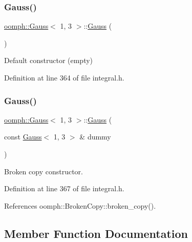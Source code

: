 \subsubsection{\texorpdfstring{Gauss()}{Gauss()}\hspace{0.1cm}{\footnotesize\ttfamily [1/2]}}
{\footnotesize\ttfamily \hyperlink{classoomph_1_1Gauss}{oomph\+::\+Gauss}$<$ 1, 3 $>$\+::\hyperlink{classoomph_1_1Gauss}{Gauss} (\begin{DoxyParamCaption}{ }\end{DoxyParamCaption})\hspace{0.3cm}{\ttfamily [inline]}}



Default constructor (empty) 



Definition at line 364 of file integral.\+h.

\mbox{\label{classoomph_1_1Gauss_3_011_00_013_01_4_acd86ad7f9056e9dd6dad427918d874da}} 
\subsubsection{\texorpdfstring{Gauss()}{Gauss()}\hspace{0.1cm}{\footnotesize\ttfamily [2/2]}}
{\footnotesize\ttfamily \hyperlink{classoomph_1_1Gauss}{oomph\+::\+Gauss}$<$ 1, 3 $>$\+::\hyperlink{classoomph_1_1Gauss}{Gauss} (\begin{DoxyParamCaption}\item[{const \hyperlink{classoomph_1_1Gauss}{Gauss}$<$ 1, 3 $>$ \&}]{dummy }\end{DoxyParamCaption})\hspace{0.3cm}{\ttfamily [inline]}}



Broken copy constructor. 



Definition at line 367 of file integral.\+h.



References oomph\+::\+Broken\+Copy\+::broken\+\_\+copy().



\subsection{Member Function Documentation}
\mbox{\label{classoomph_1_1Gauss_3_011_00_013_01_4_a51a037fb3812b418ff85d382ef1db1fa}} 
